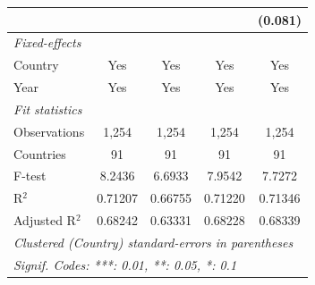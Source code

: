 \begin{table}[H]
\begin{tabular}{lcccc}
                                                                     &                &                &                & (0.081)\\   
      \midrule
      \emph{Fixed-effects}\\
      Country                                                        & Yes            & Yes            & Yes            & Yes\\  
      Year                                                           & Yes            & Yes            & Yes            & Yes\\  
      \midrule
      \emph{Fit statistics}\\
      Observations                                                   & 1,254          & 1,254          & 1,254          & 1,254\\  
      Countries                                                      & 91             & 91             & 91             & 91\\  
      F-test                                                         & 8.2436         & 6.6933         & 7.9542         & 7.7272\\  
      R$^2$                                                          & 0.71207        & 0.66755        & 0.71220        & 0.71346\\  
      Adjusted R$^2$                                                 & 0.68242        & 0.63331        & 0.68228        & 0.68339\\  
      \midrule \midrule
      \multicolumn{5}{l}{\emph{Clustered (Country) standard-errors in parentheses}}\\
      \multicolumn{5}{l}{\emph{Signif. Codes: ***: 0.01, **: 0.05, *: 0.1}}\\
   \end{tabular}
\end{table}


